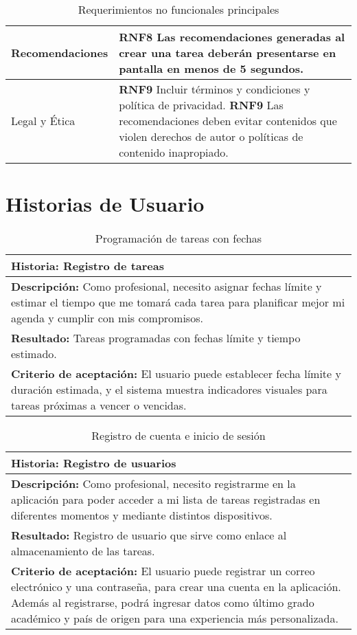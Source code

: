 \documentclass[11pt]{article}
\begin{document}
\begin{table}[H]
\begin{tabular}{|p{3cm}|p{12cm}|}
    \hline
    Recomendaciones & \textbf{RNF8} Las recomendaciones generadas al crear una tarea deberán presentarse en pantalla en menos de \textbf{5 segundos}.\\ 
    \hline
    Legal y Ética & \textbf{RNF9} Incluir términos y condiciones y política de privacidad. \newline
                   \textbf{RNF9} Las recomendaciones deben evitar contenidos que violen derechos de autor o políticas de contenido inapropiado. \\ 
    \hline
    \end{tabular}
    \caption{Requerimientos no funcionales principales}
    \label{tab:nfr}
\end{table}

\pagebreak
\section{Historias de Usuario}
\begin{table}[H]
    \centering
    \begin{tabular}{|p{15cm}|}
    \hline
    \textbf{Historia: } Registro de tareas\\
    \hline
    \textbf{Descripción: }Como profesional, necesito asignar fechas límite y estimar el tiempo que me tomará cada tarea para planificar mejor mi agenda y 
    cumplir con mis compromisos.\\
    \hline
    \textbf{Resultado: } Tareas programadas con fechas límite y tiempo estimado.\\
    \hline
    \textbf{Criterio de aceptación: } El usuario puede establecer fecha límite y duración estimada, y el sistema muestra indicadores visuales para 
    tareas próximas a vencer o vencidas.\\
    \hline
    \end{tabular}
    \caption{Programación de tareas con fechas}
    \label{user-story1}
\end{table}

\begin{table}[H]
    \centering
    \begin{tabular}{|p{15cm}|}
    \hline
    \textbf{Historia: } Registro de usuarios\\
    \hline
    \textbf{Descripción: }Como profesional, necesito registrarme en la aplicación para poder acceder a mi lista de tareas registradas en diferentes momentos y  mediante distintos
     dispositivos.\\
    \hline
    \textbf{Resultado: } Registro de usuario que sirve como enlace al almacenamiento de las tareas.\\
    \hline
    \textbf{Criterio de aceptación: } El usuario puede registrar un correo electrónico y una contraseña, para crear una cuenta en la aplicación. Además al registrarse, podrá 
    ingresar datos como último grado académico y país de origen para una experiencia más personalizada.\\
    \hline
    \end{tabular}
    \caption{Registro de cuenta e inicio de sesión}
    \label{user-story1_1}
\end{table}
\end{document}
